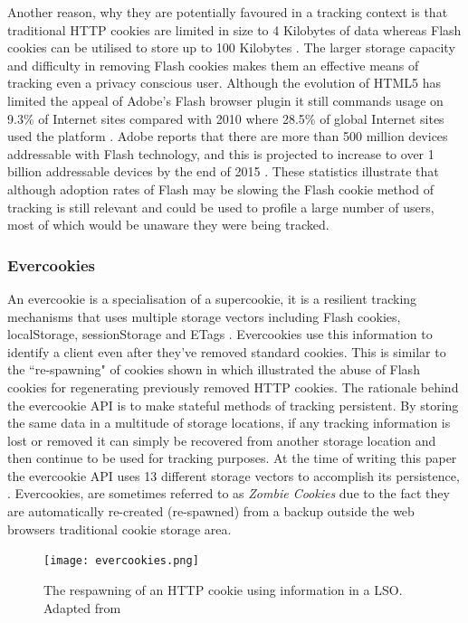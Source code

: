 \documentclass[12pt]{article}
\begin{document}
Another reason, why they are potentially favoured in a tracking context is that traditional HTTP cookies are limited in size to 4 Kilobytes of data whereas Flash cookies can be utilised to store up to 100 Kilobytes \parencite{flashCookies}. The larger storage capacity and difficulty in removing Flash cookies makes them an effective means of tracking even a privacy conscious user. Although the evolution of HTML5 has limited the appeal of Adobe's Flash browser plugin it still commands usage on 9.3\% of Internet sites compared with 2010 where 28.5\% of global Internet sites used the platform \parencite{flashStats}. Adobe reports that there are more than 500 million devices addressable with Flash technology, and this is projected to increase to over 1 billion addressable devices by the end of 2015 \parencite{adobeFlash}. These statistics illustrate that although adoption rates of Flash may be slowing the Flash cookie method of tracking is still relevant and could be used to profile a large number of users, most of which would be unaware they were being tracked. 

\subsubsection{Evercookies} \label{evercookies}
An evercookie is a specialisation of a supercookie, it is a resilient tracking mechanisms that uses multiple storage vectors including Flash cookies, localStorage, sessionStorage and ETags \parencite{evercookies}. Evercookies use this information to identify a client even after they've removed standard cookies. This is similar to the ``re-spawning" of cookies shown in \parencite{flashCookiesPrivacy} which illustrated the abuse of Flash cookies for regenerating previously removed HTTP cookies. The rationale behind the evercookie API is to make stateful methods of tracking persistent. By storing the same data in a multitude of storage locations, if any tracking information is lost or removed it can simply be recovered from another storage location and then continue to be used for tracking purposes. At the time of writing this paper the evercookie API uses 13 different storage vectors to accomplish its persistence,  \parencite{evercookies}. Evercookies, are sometimes referred to as \textit{Zombie Cookies} due to the fact they are automatically re-created (re-spawned) from a backup outside the web browsers traditional cookie storage area. \\

\begin{figure}[H]
    \centering
    \texttt{[image: evercookies.png]}
    \caption{The respawning of an HTTP cookie using information in a LSO. Adapted from \parencite{webNeverForgets}}
    \label{fig:evercookies}
\end{figure}
\end{document}
